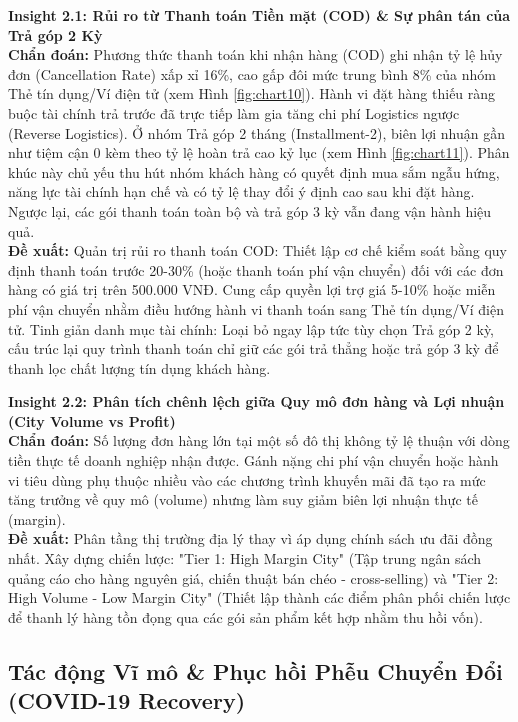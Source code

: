 \documentclass{article}
\begin{document}
\textbf{Insight 2.1: Rủi ro từ Thanh toán Tiền mặt (COD) \& Sự phân tán của Trả góp 2 Kỳ} \\
\textbf{Chẩn đoán:} Phương thức thanh toán khi nhận hàng (COD) ghi nhận tỷ lệ hủy đơn (Cancellation Rate) xấp xỉ 16\%, cao gấp đôi mức trung bình 8\% của nhóm Thẻ tín dụng/Ví điện tử (xem Hình \ref{fig:chart10}). Hành vi đặt hàng thiếu ràng buộc tài chính trả trước đã trực tiếp làm gia tăng chi phí Logistics ngược (Reverse Logistics). Ở nhóm Trả góp 2 tháng (Installment-2), biên lợi nhuận gần như tiệm cận 0 kèm theo tỷ lệ hoàn trả cao kỷ lục (xem Hình \ref{fig:chart11}). Phân khúc này chủ yếu thu hút nhóm khách hàng có quyết định mua sắm ngẫu hứng, năng lực tài chính hạn chế và có tỷ lệ thay đổi ý định cao sau khi đặt hàng. Ngược lại, các gói thanh toán toàn bộ và trả góp 3 kỳ vẫn đang vận hành hiệu quả.
\\
\textbf{Đề xuất:} Quản trị rủi ro thanh toán COD: Thiết lập cơ chế kiểm soát bằng quy định thanh toán trước 20-30\% (hoặc thanh toán phí vận chuyển) đối với các đơn hàng có giá trị trên 500.000 VNĐ. Cung cấp quyền lợi trợ giá 5-10\% hoặc miễn phí vận chuyển nhằm điều hướng hành vi thanh toán sang Thẻ tín dụng/Ví điện tử. Tinh giản danh mục tài chính: Loại bỏ ngay lập tức tùy chọn Trả góp 2 kỳ, cấu trúc lại quy trình thanh toán chỉ giữ các gói trả thẳng hoặc trả góp 3 kỳ để thanh lọc chất lượng tín dụng khách hàng.

\textbf{Insight 2.2: Phân tích chênh lệch giữa Quy mô đơn hàng và Lợi nhuận (City Volume vs Profit)} \\
\textbf{Chẩn đoán:} Số lượng đơn hàng lớn tại một số đô thị không tỷ lệ thuận với dòng tiền thực tế doanh nghiệp nhận được. Gánh nặng chi phí vận chuyển hoặc hành vi tiêu dùng phụ thuộc nhiều vào các chương trình khuyến mãi đã tạo ra mức tăng trưởng về quy mô (volume) nhưng làm suy giảm biên lợi nhuận thực tế (margin).
\\
\textbf{Đề xuất:} Phân tầng thị trường địa lý thay vì áp dụng chính sách ưu đãi đồng nhất. Xây dựng chiến lược: "Tier 1: High Margin City" (Tập trung ngân sách quảng cáo cho hàng nguyên giá, chiến thuật bán chéo - cross-selling) và "Tier 2: High Volume - Low Margin City" (Thiết lập thành các điểm phân phối chiến lược để thanh lý hàng tồn đọng qua các gói sản phẩm kết hợp nhằm thu hồi vốn).

\subsection{Tác động Vĩ mô \& Phục hồi Phễu Chuyển Đổi (COVID-19 Recovery)}
\end{document}
